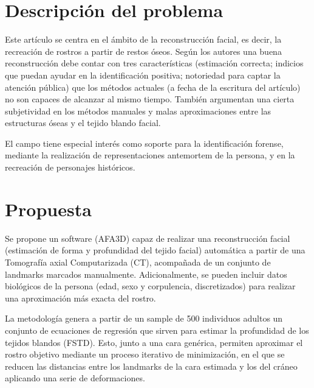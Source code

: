\documentclass[13pt,a4paper]{article}
\begin{document}
    
    

    \newpage


\section{Descripción del problema}
Este artículo se centra en el ámbito de la reconstrucción facial, es decir, la recreación de rostros a partir de restos óseos. Según los autores una buena reconstrucción debe contar con tres características (estimación correcta; indicios que puedan ayudar en la identificación positiva; notoriedad para captar la atención pública) que los métodos actuales (a fecha de la escritura del artículo) no son capaces de alcanzar al mismo tiempo. También argumentan una cierta subjetividad en los métodos manuales y malas aproximaciones entre las estructuras óseas y el tejido blando facial.

El campo tiene especial interés como soporte para la identificación forense, mediante la realización de representaciones antemortem de la persona, y en la recreación de personajes históricos.

\section{Propuesta}
Se propone un software (AFA3D) capaz de realizar una reconstrucción facial (estimación de forma y profundidad del tejido facial) automática a partir de una Tomografía axial Computarizada (CT), acompañada de un conjunto de landmarks marcados manualmente. Adicionalmente, se pueden incluir datos biológicos de la persona (edad, sexo y corpulencia, discretizados) para realizar una aproximación más exacta del rostro.

\vspace{\baselineskip}

La metodología genera a partir de un sample de 500 individuos adultos un conjunto de ecuaciones de regresión que sirven para estimar la profundidad de los tejidos blandos (FSTD). Esto, junto a una cara genérica, permiten aproximar el rostro objetivo mediante un proceso iterativo de minimización, en el que se reducen las distancias entre los landmarks de la cara estimada y los del cráneo aplicando una serie de deformaciones.
\end{document}
